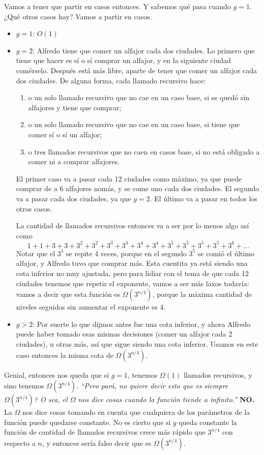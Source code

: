 \documentclass{article}
\begin{document}
Vamos a tener que partir en casos entonces. Y sabemos qué pasa cuando $g=1$. ¿Qué otros casos hay? Vamos a partir en casos.

\begin{itemize}
    \item $g=1$: $O(1)$
    \item $g=2$: Alfredo tiene que comer un alfajor cada dos ciudades. Lo primero que tiene que hacer es sí o sí comprar un alfajor, y en la siguiente ciudad comérselo. Después está más libre, aparte de tener que comer un alfajor cada dos ciudades. De alguna forma, cada llamado recursivo hace:
    \begin{enumerate}
    \item o un solo llamado recursivo que no cae en un caso base, si se quedó sin alfajores y tiene que comprar;
    \item o un solo llamado recursivo que no cae en un caso base, si tiene que comer sí o sí un alfajor;
    \item o tres llamados recursivos que no caen en casos base, si no está obligado a comer ni a comprar alfajores.
    \end{enumerate}
    El primer caso va a pasar cada 12 ciudades como máximo, ya que puede comprar de a 6 alfajores nomás, y se come uno cada dos ciudades. El segundo va a pasar cada dos ciudades, ya que $g=2$. El último va a pasar en todos los otros casos.

    La cantidad de llamados recursivos entonces va a ser por lo menos algo así como \[
    1 + 1 + 3 + 3 + 3^2 + 3^2 + 3^3 + 3^3 + 3^4 + 3^4 + 3^5 + 3^5 + 3^5 + 3^5 + 3^6 + \dots
    \]
    Notar que el $3^5$ se repite 4 veces, porque en el segundo $3^5$ se comió el último alfajor, y Alfredo tuvo que comprar más. Esta cuentita ya está siendo una cota inferior no muy ajustada, pero para lidiar con el tema de que cada 12 ciudades tenemos que repetir el exponente, vamos a ser más laxos todavía: vamos a decir que esta función es $\Omega(3^{n/4})$, porque la máxima cantidad de niveles seguidos sin aumentar el exponente es 4.
    \item $g>2$: Por suerte lo que dijmos antes fue una cota inferior, y ahora Alfredo puede haber tomado esas mismas decisiones (comer un alfajor cada 2 ciudades), u otras más, así que sigue siendo una cota inferior. Usamos en este caso entonces la misma cota de $\Omega(3^{n/4})$.
\end{itemize}

Genial, entonces nos queda que si $g=1$, tenemos $\Omega(1)$ llamados recursivos, y sino tenemos $\Omega(3^{n/4})$. \emph{``Pero pará, no quiere decir esto que es siempre $\Omega(3^{n/4})$? O sea, el $\Omega$ nos dice cosas cuando la función tiende a infinito.''} \textbf{NO.} La $\Omega$ nos dice cosas tomando en cuenta que cualquiera de los parámetros de la función puede quedarse constante. No es cierto que si $g$ queda constante la función de cantidad de llamados recursivos crece más rápido que $3^{n/4}$ con respecto a $n$, y entonces sería falso decir que es $\Omega(3^{n/4})$.
\end{document}
